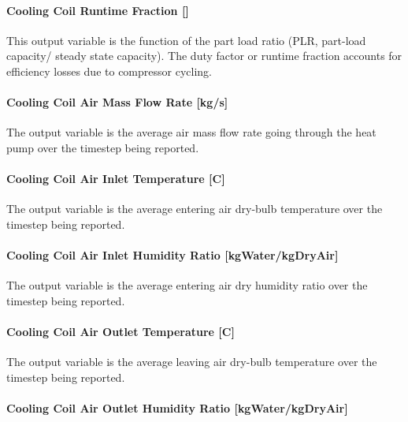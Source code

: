 \paragraph{\texorpdfstring{Cooling Coil Runtime Fraction {[]}}{Cooling Coil Runtime Fraction }}\label{cooling-coil-runtime-fraction-7}

This output variable is the function of the part load ratio (PLR, part-load capacity/ steady state capacity). The duty factor or runtime fraction accounts for efficiency losses due to compressor cycling.

\paragraph{Cooling Coil Air Mass Flow Rate {[}kg/s{]}}\label{cooling-coil-air-mass-flow-rate-kgs-2}

The output variable is the average air mass flow rate going through the heat pump over the timestep being reported.

\paragraph{Cooling Coil Air Inlet Temperature {[}C{]}}\label{cooling-coil-air-inlet-temperature-c-2}

The output variable is the average entering air dry-bulb temperature over the timestep being reported.

\paragraph{Cooling Coil Air Inlet Humidity Ratio {[}kgWater/kgDryAir{]}}\label{cooling-coil-air-inlet-humidity-ratio-kgwaterkgdryair-2}

The output variable is the average entering air dry humidity ratio over the timestep being reported.

\paragraph{Cooling Coil Air Outlet Temperature {[}C{]}}\label{cooling-coil-air-outlet-temperature-c-2}

The output variable is the average leaving air dry-bulb temperature over the timestep being reported.

\paragraph{Cooling Coil Air Outlet Humidity Ratio {[}kgWater/kgDryAir{]}}\label{cooling-coil-air-outlet-humidity-ratio-kgwaterkgdryair-2}

